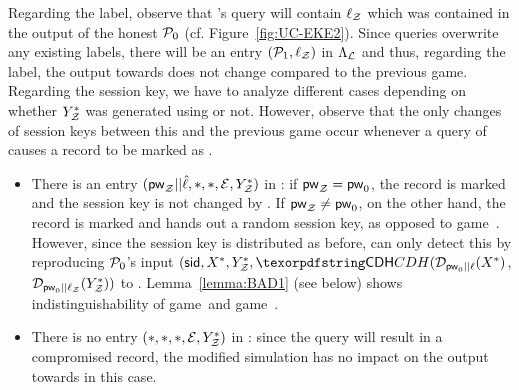 \begin{games}

Regarding the label, observe that \Sim's \NewKey query will contain $\ell_\mathcal{Z}$ which was contained in the output of the honest $\mathcal{P}_{0}$ (cf. Figure~\ref{fig:UC-EKE2}). Since \TestPwd queries overwrite any existing labels, there will be an entry $(\mathcal{P}_{1},\ell_\mathcal{Z})$ in $\Lambda_{\mathcal{L}}$ and thus, regarding the label, the output towards \Env does not change compared to the previous game. Regarding the session key, we have to analyze different cases depending on whether $Y^*_\mathcal{Z}$ was generated using \Fic or not. However, observe that the only changes of session keys between this and the previous game occur whenever a \TestPwd query of \Sim causes a record to be marked as .

\begin{itemize}
 \item There is an entry $(\mathsf{pw}_\mathcal{Z}||\hat\ell,*,*,\mathcal{E},Y^*_\mathcal{Z})$ in \ListIC: if $\mathsf{pw}_\mathcal{Z}=\mathsf{pw}_{0}$, the record is marked  and the session key is not changed by \Func. If $\mathsf{pw}_\mathcal{Z}\neq\mathsf{pw}_{0}$, on the other hand, the record is marked  and \Func hands out a random session key, as opposed to game~\previousgame. 
	 However, since the session key is distributed as before, \Env can only detect this by reproducing $\mathcal{P}_{0}$'s input $(\sid,X^*,Y^*_\Env,\CDH(\Decrypt_{\firstpw||\ell}(X^*)$, $\mathcal{D}_{\mathsf{pw}_{0}||\ell_\mathcal{Z}}(Y^*_\mathcal{Z}))$ to \Fro. 
Lemma~\ref{lemma:BAD1} (see below) shows indistinguishability of game~\previousgame and game~\thisgame.
 \item There is no entry $(*,*,*,\mathcal{E},Y^*_\mathcal{Z})$ in \ListIC: since the \TestPwd query will result in a compromised record, the modified simulation has no impact on the output towards \Env in this case.
\end{itemize}


\end{games}
